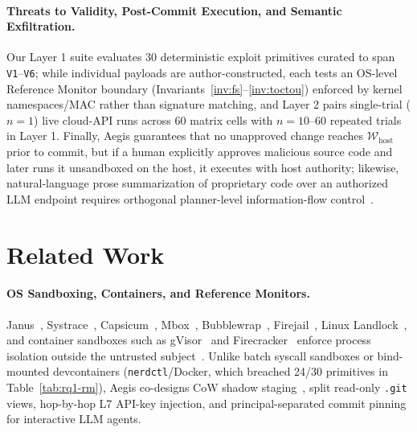 \documentclass[10pt,twocolumn]{article}
\begin{document}
\paragraph{Threats to Validity, Post-Commit Execution, and Semantic Exfiltration.}
Our Layer 1 suite evaluates 30 deterministic exploit primitives curated to span \texttt{V1}--\texttt{V6}; while individual payloads are author-constructed, each tests an OS-level Reference Monitor boundary (Invariants~\ref{inv:fs}--\ref{inv:toctou}) enforced by kernel namespaces/MAC rather than signature matching, and Layer 2 pairs single-trial ($n=1$) live cloud-API runs across 60 matrix cells with $n=10\text{--}60$ repeated trials in Layer 1. Finally, Aegis guarantees that no unapproved change reaches $\mathcal{W}_{\text{host}}$ prior to commit, but if a human explicitly approves malicious source code and later runs it unsandboxed on the host, it executes with host authority; likewise, natural-language prose summarization of proprietary code over an authorized LLM endpoint requires orthogonal planner-level information-flow control~\cite{debenedetti2025camel,costa2025fides}.

\section{Related Work}
\label{sec:related}

\paragraph{OS Sandboxing, Containers, and Reference Monitors.}
Janus~\cite{goldberg1996secure}, Systrace~\cite{provos2003systrace}, Capsicum~\cite{watson2010capsicum}, Mbox~\cite{kim2013mbox}, Bubblewrap~\cite{containers2024bubblewrap}, Firejail~\cite{netblue2024firejail}, Linux Landlock~\cite{salaun2021landlock}, and container sandboxes such as gVisor~\cite{young2019gvisor} and Firecracker~\cite{agache2020firecracker} enforce process isolation outside the untrusted subject~\cite{anderson1972computer,saltzer1975protection}. Unlike batch syscall sandboxes or bind-mounted devcontainers (\texttt{nerdctl}/Docker, which breached 24/30 primitives in Table~\ref{tab:rq1-rm}), Aegis co-designs CoW shadow staging~\cite{nightingale2005speculator,porter2009txos,wright2004unionfs}, split read-only \texttt{.git} views, hop-by-hop L7 API-key injection, and principal-separated commit pinning for interactive LLM agents.
\end{document}
